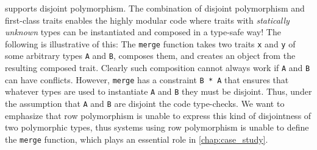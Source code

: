 \begin{comment}
One important difference to traditional traits or classes is that traits in
\sedel are quite dynamic: we are able to compose traits \emph{dynamically} and
then instantiate them later. We have seen an example of dynamic inheritance in
\cref{sec:trait:overview} to mimic mixins, where disjoint polymorphism plays an
important role. This is impossible in traditional OO languages, such as Scala,
since classes being inherited/instantiated must be known statically.

In Scala, given two concrete traits, it is possible to use \emph{mixin composition} to
create an object that implements both traits.
\begin{lstlisting}[language=scala]
trait A
trait B
val newAB : A with B = new A with B
\end{lstlisting}
Here the type \lstinline[language=scala]{A with B} is an intersection type,
and the expression \lstinline[language=scala]{new A with B} allows creating a new
object from the combination of the traits \lstinline{A} and
\lstinline{B}.
However, in Scala it is not possible to dynamically compose two
(statically unknown) \emph{objects}. For example, the following code: \jeremy{how is this useful to have?}
\begin{lstlisting}[language=scala]
// Invalid Scala code:
def merge[A,B] (x: A) (y: B) : A with B = new x with y
\end{lstlisting}
is rejected by the Scala compiler. The problem is that the
\lstinline[language=scala]{with} construct in Scala can only be used to mixin
(statically known) traits or classes, not arbitrary objects. This limitation essentially puts
intersection types in Scala in a second-class status.
\end{comment}

\sedel supports disjoint polymorphism. The combination of disjoint
polymorphism and first-class traits enables the highly modular code
where traits with \emph{statically unknown} types can be instantiated
and composed in a type-safe way! The following is illustrative of this:
The \lstinline{merge} function takes two traits \lstinline{x} and \lstinline{y} of
some arbitrary types \lstinline{A} and \lstinline{B}, composes them,
and creates an object from the resulting composed trait. Clearly
such composition cannot always work if \lstinline{A} and
\lstinline{B} can have conflicts. However, \lstinline{merge} has a
constraint \lstinline{B * A} that ensures that whatever types are used
to instantiate \lstinline{A} and \lstinline{B} they must be disjoint.
Thus, under the assumption that \lstinline{A} and \lstinline{B} are
disjoint the code type-checks. We want to emphasize that row polymorphism is unable to express
this kind of disjointness of two polymorphic types, thus systems using row polymorphism is unable to define
the \lstinline{merge} function, which plays an essential role in \cref{chap:case_study}.

